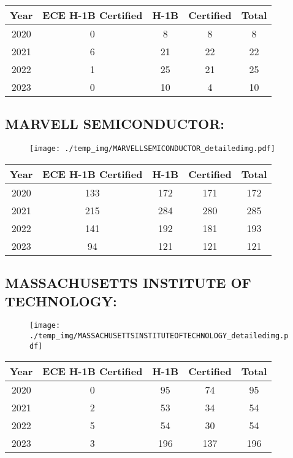 \documentclass{article}%
\begin{document}
%
\begin{longtable}{c|c|c|c|c}%
\hline%
Year&ECE H{-}1B Certified&H{-}1B&Certified&Total\\%
\hline%
2020&0&8&8&8\\%
\hline%
2021&6&21&22&22\\%
\hline%
2022&1&25&21&25\\%
\hline%
2023&0&10&4&10\\%
\hline%
\end{longtable}

%
\newpage%
\subsection{MARVELL SEMICONDUCTOR:}%
\label{subsec:MARVELLSEMICONDUCTOR}%
\label{MARVELLSEMICONDUCTORdetailed}%


\begin{figure}[htbp]%
\centering%
\texttt{[image: ./temp\_img/MARVELLSEMICONDUCTOR\_detailedimg.pdf]}%
\end{figure}

%
\begin{longtable}{c|c|c|c|c}%
\hline%
Year&ECE H{-}1B Certified&H{-}1B&Certified&Total\\%
\hline%
2020&133&172&171&172\\%
\hline%
2021&215&284&280&285\\%
\hline%
2022&141&192&181&193\\%
\hline%
2023&94&121&121&121\\%
\hline%
\end{longtable}

%
\newpage%
\subsection{MASSACHUSETTS INSTITUTE OF TECHNOLOGY:}%
\label{subsec:MASSACHUSETTSINSTITUTEOFTECHNOLOGY}%
\label{MASSACHUSETTSINSTITUTEOFTECHNOLOGYdetailed}%


\begin{figure}[htbp]%
\centering%
\texttt{[image: ./temp\_img/MASSACHUSETTSINSTITUTEOFTECHNOLOGY\_detailedimg.pdf]}%
\end{figure}

%
\begin{longtable}{c|c|c|c|c}%
\hline%
Year&ECE H{-}1B Certified&H{-}1B&Certified&Total\\%
\hline%
2020&0&95&74&95\\%
\hline%
2021&2&53&34&54\\%
\hline%
2022&5&54&30&54\\%
\hline%
2023&3&196&137&196\\%
\hline%
\end{longtable}
\end{document}
